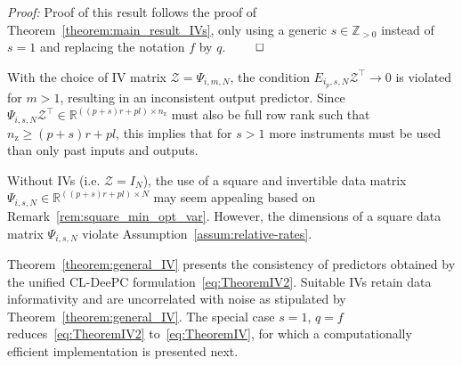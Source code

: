 \textit{Proof:} %
Proof of this result follows the proof of Theorem~\ref{theorem:main_result_IVs}, only using a generic $s\in\mathbb{Z}_{>0}$ instead of $s=1$ and replacing the notation $f$ by $q$. $\hfill\qed$
\setcounter{thm}{2}
\begin{rem}
    With the choice of \acs{IV} matrix $\mathcal{Z}=\Psi_{i,m,N}$, the condition $E_{i_p,s,N}\mathcal{Z}^\top\rightarrow0$ is violated for $m>1$, resulting in an inconsistent output predictor. Since $\Psi_{i,s,N}\mathcal{Z}^\top\in\mathbb{R}^{((p+s)r+pl)\times n_\mathrm{z}}$ must also be full row rank such that ${n_\mathrm{z}\geq(p+s)r+pl}$, this implies that for $s>1$ more instruments must be used than only past inputs and outputs.
\end{rem}
\begin{rem}
    Without \ac{IVs} (i.e. $\mathcal{Z}=I_N$), the use of a square and invertible data matrix ${\Psi_{i,s,N}\in\mathbb{R}^{((p+s)r+pl)\times N}}$ may seem appealing based on Remark~\ref{rem:square_min_opt_var}. However, the dimensions of a square data matrix $\Psi_{i,s,N}$ violate Assumption~\ref{assum:relative-rates}.
\end{rem}

Theorem~\ref{theorem:general_IV} presents the consistency of predictors obtained by the unified \ac{CL-DeePC} formulation~\eqref{eq:TheoremIV2}. Suitable \ac{IVs} retain data informativity and are uncorrelated with noise as stipulated by Theorem~\ref{theorem:general_IV}. The special case $s=1$, $q=f$ reduces~\eqref{eq:TheoremIV2} to~\eqref{eq:TheoremIV}, for which a computationally efficient implementation is presented next.
